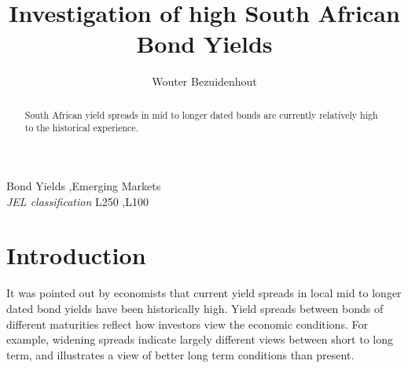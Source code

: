 \documentclass[11pt,preprint, authoryear]{elsarticle}
\numberwithin{equation}{section}
\numberwithin{figure}{section}
\numberwithin{table}{section}
\begin{document}
\begin{frontmatter}  %

\title{Investigation of high South African Bond Yields}





\author[Add1]{Wouter Bezuidenhout}





\address[Add1]{Stellenbosch University, South Africa}


\begin{abstract}
\small{
South African yield spreads in mid to longer dated bonds are currently
relatively high to the historical experience.
}
\end{abstract}

\vspace{1cm}


\begin{keyword}
\footnotesize{
Bond Yields \sep Emerging Markets \\
\vspace{0.3cm}
}
\footnotesize{
\textit{JEL classification} L250 \sep L100
}
\end{keyword}



\vspace{0.5cm}

\end{frontmatter}



\pagestyle{fancy}
\chead{}
\rhead{}
\lfoot{}
\lhead{}
\cfoot{}


\headsep 35pt %




\hypertarget{introduction}{%
\section{Introduction}\label{introduction}}

It was pointed out by economists that current yield spreads in local mid
to longer dated bond yields have been historically high. Yield spreads
between bonds of different maturities reflect how investors view the
economic conditions. For example, widening spreads indicate largely
different views between short to long term, and illustrates a view of
better long term conditions than present.
\end{document}
